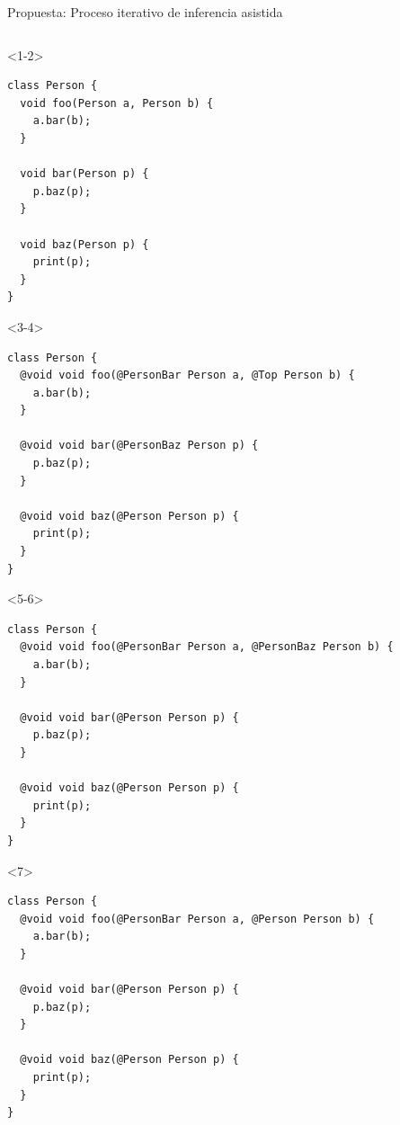 \documentclass[aspectratio=169,10pt]{beamer}
\begin{document}
\begin{frame}[fragile]{Propuesta: Proceso iterativo de inferencia asistida}

    \begin{columns}
      \begin{column}{0.5\textwidth}
				\begin{onlyenv}<1-2>
					\only<2-|handout:0>{\stepcounter{framenumber}}
    \begin{lstlisting}
class Person {
  void foo(Person a, Person b) {
    a.bar(b);
  }

  void bar(Person p) {
    p.baz(p);
  }

  void baz(Person p) {
    print(p);
  }
}
\end{lstlisting}
\end{onlyenv}
\begin{onlyenv}<3-4>
\begin{lstlisting}
class Person {
  @void void foo(@PersonBar Person a, @Top Person b) {
    a.bar(b);
  }

  @void void bar(@PersonBaz Person p) {
    p.baz(p);
  }

  @void void baz(@Person Person p) {
    print(p);
  }
}
\end{lstlisting}
\end{onlyenv}
\begin{onlyenv}<5-6>
\begin{lstlisting}
class Person {
  @void void foo(@PersonBar Person a, @PersonBaz Person b) {
    a.bar(b);
  }

  @void void bar(@Person Person p) {
    p.baz(p);
  }

  @void void baz(@Person Person p) {
    print(p);
  }
}
\end{lstlisting}
\end{onlyenv}
\begin{onlyenv}<7>
\begin{lstlisting}
class Person {
  @void void foo(@PersonBar Person a, @Person Person b) {
    a.bar(b);
  }

  @void void bar(@Person Person p) {
    p.baz(p);
  }

  @void void baz(@Person Person p) {
    print(p);
  }
}
\end{lstlisting}
\end{onlyenv}
      \end{column}


\end{columns}
\end{frame}
\end{document}

